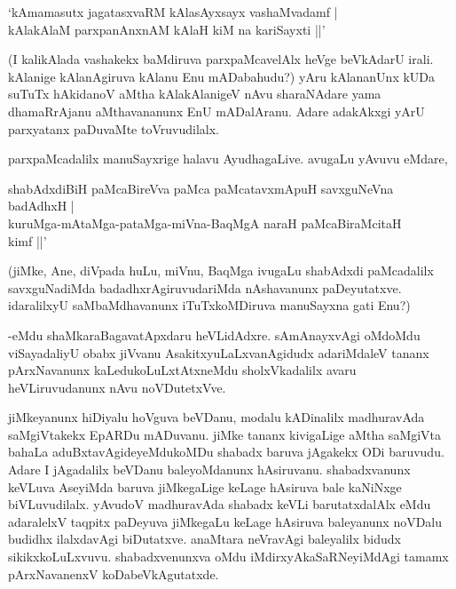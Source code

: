 \begin{shloka}
`kAmamasutx jagatasxvaRM kAlasAyxsayx vashaMvadamf |\\
kAlakAlaM parxpanAnxnAM kAlaH kiM na kariSayxti ||'
\end{shloka}

(I kalikAlada vashakekx baMdiruva parxpaMcavelAlx heVge beVkAdarU irali. kAlanige kAlanAgiruva kAlanu Enu mADabahudu?) yAru kAlananUnx kUDa suTuTx hAkidanoV aMtha kAlakAlanigeV nAvu sharaNAdare yama dhamaRrAjanu aMthavananunx EnU mADalAranu. Adare adakAkxgi yArU parxyatanx paDuvaMte toVruvudilalx.

parxpaMcadalilx manuSayxrige halavu AyudhagaLive. avugaLu yAvuvu eMdare,

\begin{shloka}
shabAdxdiBiH paMcaBireVva paMca paMcatavxmApuH savxguNeVna badAdhxH |\\
kuruMga-mAtaMga-pataMga-miVna-BaqMgA naraH paMcaBiraMcitaH\\
\hspace{5.5cm} kimf ||'
\end{shloka}

(jiMke, Ane, diVpada huLu, miVnu, BaqMga ivugaLu shabAdxdi paMcadalilx savxguNadiMda badadhxrAgiruvudariMda nAshavanunx paDeyutatxve. idaralilxyU saMbaMdhavanunx iTuTxkoMDiruva manuSayxna gati Enu?)

-eMdu shaMkaraBagavatApxdaru heVLidAdxre. sAmAnayxvAgi oMdoMdu viSayadaliyU obabx jiVvanu AsakitxyuLaLxvanAgidudx adariMdaleV tananx pArxNavanunx kaLedukoLuLxtAtxneMdu sholxVkadalilx avaru heVLiruvudanunx nAvu noVDutetxVve.

jiMkeyanunx hiDiyalu hoVguva beVDanu, modalu kADinalilx madhuravAda saMgiVtakekx EpARDu mADuvanu. jiMke tananx kivigaLige aMtha saMgiVta bahaLa aduBxtavAgideyeMdukoMDu shabadx baruva jAgakekx ODi baruvudu. Adare I jAgadalilx beVDanu baleyoMdanunx hAsiruvanu. shabadxvanunx keVLuva AseyiMda baruva jiMkegaLige keLage hAsiruva bale kaNiNxge biVLuvudilalx. yAvudoV madhuravAda shabadx keVLi barutatxdalAlx eMdu adaralelxV taqpitx paDeyuva jiMkegaLu keLage hAsiruva baleyanunx noVDalu budidhx ilalxdavAgi biDutatxve. anaMtara neVravAgi baleyalilx bidudx sikikxkoLuLxvuvu. shabadxvenunxva oMdu iMdirxyAkaSaRNeyiMdAgi tamamx pArxNavanenxV koDabeVkAgutatxde.

